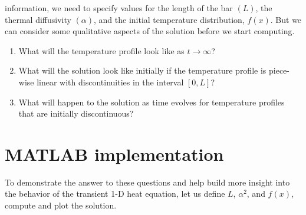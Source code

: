  information, we need to specify values for the length of the bar $(L)$, the thermal diffusivity $(\alpha)$, and the initial temperature distribution, $f(x)$.  But we can consider some qualitative aspects of the solution before we start computing.
\begin{enumerate}

\item What will the temperature profile look like as $t \rightarrow \infty$?

\item What will the solution look like initially if the temperature profile is piece-wise linear with discontinuities in the interval $[0,L]$?

\item What will happen to the solution as time evolves for temperature profiles that are initially discontinuous? 

\end{enumerate}

\vspace{4.0cm}

\section{MATLAB implementation}
To demonstrate the answer to these questions and help build more insight into the behavior of the transient 1-D heat equation, let us define $L$, $\alpha^2$, and $f(x)$, compute and plot the solution.
\setcounter{lstannotation}{0} %


